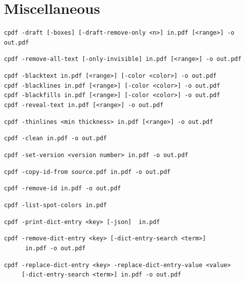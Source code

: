\documentclass{book}
\begin{document}
\chapter{Miscellaneous}\label{chap:misc}\pagestyle{fancy}
  {\small\begin{framed}
  \noindent\verb!cpdf -draft [-boxes] [-draft-remove-only <n>] in.pdf [<range>] -o out.pdf!

  \vspace{1.5mm}
  \noindent\verb!cpdf -remove-all-text [-only-invisible] in.pdf [<range>] -o out.pdf!

  \vspace{1.5mm}
  \noindent\verb!cpdf -blacktext in.pdf [<range>] [-color <color>] -o out.pdf!\\
  \noindent\verb!cpdf -blacklines in.pdf [<range>] [-color <color>] -o out.pdf!\\
  \noindent\verb!cpdf -blackfills in.pdf [<range>] [-color <color>] -o out.pdf!\\
  \noindent\verb!cpdf -reveal-text in.pdf [<range>] -o out.pdf!

  \vspace{1.5mm}
  \noindent\verb!cpdf -thinlines <min thickness> in.pdf [<range>] -o out.pdf!

  \vspace{1.5mm}
  \noindent\verb!cpdf -clean in.pdf -o out.pdf!

  \vspace{1.5mm}
  \noindent\verb!cpdf -set-version <version number> in.pdf -o out.pdf!

  \vspace{1.5mm}
  \noindent\verb!cpdf -copy-id-from source.pdf in.pdf -o out.pdf!

  \vspace{1.5mm}
  \noindent\verb!cpdf -remove-id in.pdf -o out.pdf!

  \vspace{1.5mm}
  \noindent\verb!cpdf -list-spot-colors in.pdf!

  \vspace{1.5mm}
  \noindent\verb!cpdf -print-dict-entry <key> [-json]  in.pdf!

  \vspace{1.5mm}
  \noindent\verb!cpdf -remove-dict-entry <key> [-dict-entry-search <term>]!\\
  \noindent\verb!      in.pdf -o out.pdf!

  \vspace{1.5mm}
  \noindent\verb!cpdf -replace-dict-entry <key> -replace-dict-entry-value <value>!\\
  \noindent\verb!     [-dict-entry-search <term>] in.pdf -o out.pdf!


\end{framed}}
\end{document}
